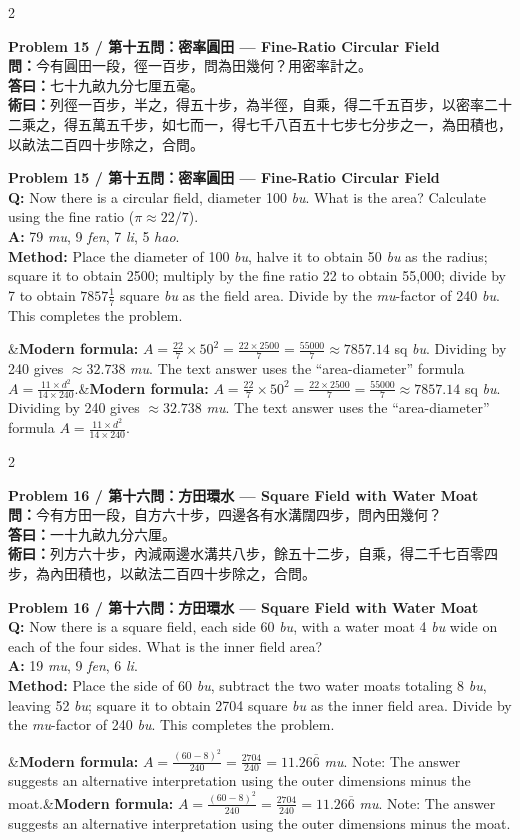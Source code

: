 \documentclass[11pt,a4paper]{article}
\newcommand{\bilingualproblem}[4]{%
  \begin{paracol}{2}
  \begin{leftcolumn}
  \noindent\textbf{\color{problemcolor}#1}\\[0.2cm]
  #2
  \end{leftcolumn}
  \switchcolumn
  \noindent\textbf{\color{problemcolor}#1}\\[0.2cm]
  #3
  \end{paracol}
  \ifx&#4&\else\vspace{0.3cm}\noindent#4\fi
  \vspace{0.5cm}
}
\newcommand{\wen}[1]{\textcolor{problemcolor}{\textbf{問：}}#1}
\newcommand{\da}[1]{\textcolor{answercolor}{\textbf{答曰：}}#1}
\newcommand{\shu}[1]{\textcolor{methodcolor}{\textbf{術曰：}}#1}
\newcommand{\wenen}[1]{\textcolor{problemcolor}{\textbf{Q:}} #1}
\newcommand{\daen}[1]{\textcolor{answercolor}{\textbf{A:}} #1}
\newcommand{\shuen}[1]{\textcolor{methodcolor}{\textbf{Method:}} #1}
\begin{document}
\bilingualproblem{Problem 15 / 第十五問：密率圓田 --- Fine-Ratio Circular Field}{
\wen{今有圓田一段，徑一百步，問為田幾何？用密率計之。}\\[0.2cm]
\da{七十九畝九分七厘五毫。}\\[0.2cm]
\shu{列徑一百步，半之，得五十步，為半徑，自乘，得二千五百步，以密率二十二乘之，得五萬五千步，如七而一，得七千八百五十七步七分步之一，為田積也，以畝法二百四十步除之，合問。}
}{
\wenen{Now there is a circular field, diameter 100 \textit{bu}. What is the area? Calculate using the fine ratio ($\pi \approx 22/7$).}\\[0.2cm]
\daen{79 \textit{mu}, 9 \textit{fen}, 7 \textit{li}, 5 \textit{hao}.}\\[0.2cm]
\shuen{Place the diameter of 100 \textit{bu}, halve it to obtain 50 \textit{bu} as the radius; square it to obtain 2500; multiply by the fine ratio 22 to obtain 55,000; divide by 7 to obtain $7857\frac{1}{7}$ square \textit{bu} as the field area. Divide by the \textit{mu}-factor of 240 \textit{bu}. This completes the problem.}
}{\textbf{Modern formula:} $A = \frac{22}{7} \times 50^2 = \frac{22 \times 2500}{7} = \frac{55000}{7} \approx 7857.14$ sq \textit{bu}. Dividing by 240 gives $\approx 32.738$ \textit{mu}. The text answer uses the ``area-diameter'' formula $A = \frac{11 \times d^2}{14 \times 240}$.}

\bilingualproblem{Problem 16 / 第十六問：方田環水 --- Square Field with Water Moat}{
\wen{今有方田一段，自方六十步，四邊各有水溝闊四步，問內田幾何？}\\[0.2cm]
\da{一十九畝九分六厘。}\\[0.2cm]
\shu{列方六十步，內減兩邊水溝共八步，餘五十二步，自乘，得二千七百零四步，為內田積也，以畝法二百四十步除之，合問。}
}{
\wenen{Now there is a square field, each side 60 \textit{bu}, with a water moat 4 \textit{bu} wide on each of the four sides. What is the inner field area?}\\[0.2cm]
\daen{19 \textit{mu}, 9 \textit{fen}, 6 \textit{li}.}\\[0.2cm]
\shuen{Place the side of 60 \textit{bu}, subtract the two water moats totaling 8 \textit{bu}, leaving 52 \textit{bu}; square it to obtain 2704 square \textit{bu} as the inner field area. Divide by the \textit{mu}-factor of 240 \textit{bu}. This completes the problem.}
}{\textbf{Modern formula:} $A = \frac{(60-8)^2}{240} = \frac{2704}{240} = 11.26\overline{6}$ \textit{mu}. Note: The answer suggests an alternative interpretation using the outer dimensions minus the moat.}
\end{document}
